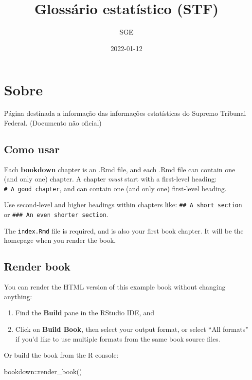 \documentclass[
]{book}
\title{Glossário estatístico (STF)}
\author{SGE}
\date{2022-01-12}
\newenvironment{Shaded}{\begin{snugshade}}{\end{snugshade}}
\newcommand{\FunctionTok}[1]{\textcolor[rgb]{0.00,0.00,0.00}{#1}}
\newcommand{\NormalTok}[1]{#1}
\newcommand{\SpecialCharTok}[1]{\textcolor[rgb]{0.00,0.00,0.00}{#1}}
\begin{document}
\maketitle

{
\setcounter{tocdepth}{1}
\tableofcontents
}
\hypertarget{sobre}{%
\chapter{Sobre}\label{sobre}}

Página destinada a informação das informações estatísticas do Supremo Tribunal Federal. (Documento não oficial)

\hypertarget{como-usar}{%
\section{Como usar}\label{como-usar}}

Each \textbf{bookdown} chapter is an .Rmd file, and each .Rmd file can contain one (and only one) chapter. A chapter \emph{must} start with a first-level heading: \texttt{\#\ A\ good\ chapter}, and can contain one (and only one) first-level heading.

Use second-level and higher headings within chapters like: \texttt{\#\#\ A\ short\ section} or \texttt{\#\#\#\ An\ even\ shorter\ section}.

The \texttt{index.Rmd} file is required, and is also your first book chapter. It will be the homepage when you render the book.

\hypertarget{render-book}{%
\section{Render book}\label{render-book}}

You can render the HTML version of this example book without changing anything:

\begin{enumerate}
\def\labelenumi{\arabic{enumi}.}
\item
  Find the \textbf{Build} pane in the RStudio IDE, and
\item
  Click on \textbf{Build Book}, then select your output format, or select ``All formats'' if you'd like to use multiple formats from the same book source files.
\end{enumerate}

Or build the book from the R console:

\begin{Shaded}
\begin{Highlighting}[]
\NormalTok{bookdown}\SpecialCharTok{::}\FunctionTok{render\_book}\NormalTok{()}
\end{Highlighting}
\end{Shaded}
\end{document}
